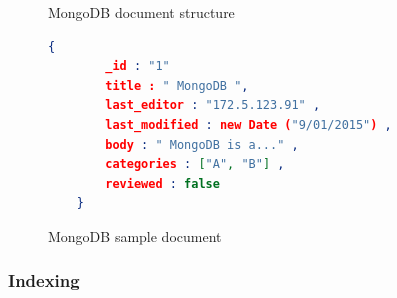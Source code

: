 \begin{figure}[h]
	\centering
	\centering
	\caption{MongoDB document structure~\citep{mongodb:org}}
	\label{fig:mongodb-doc}
	
\end{figure}

	\begin{figure}[h]
	\begin{lstlisting}[language=JSON,basicstyle=\scriptsize]
	{
		_id : "1"
		title : " MongoDB ",
		last_editor : "172.5.123.91" ,
		last_modified : new Date ("9/01/2015") ,
		body : " MongoDB is a..." ,
		categories : ["A", "B"] ,
		reviewed : false
	}
	\end{lstlisting} 
	\caption{MongoDB sample document}
	\label{sample-mongodb-document}
\end{figure}

\subsubsection{Indexing}\label{mong-xmark-indexing}

